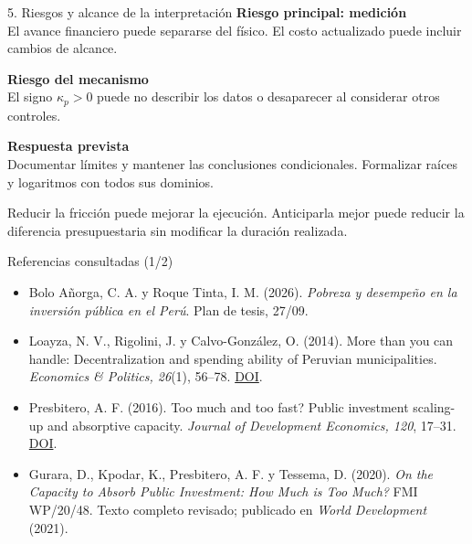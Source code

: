 \documentclass[11pt,aspectratio=169]{beamer}
\newcommand{\lead}[1]{\begin{block}{}#1\end{block}}
\begin{document}
\begin{frame}{5. Riesgos y alcance de la interpretación}
\textbf{Riesgo principal: medición}\\[1mm]
El avance financiero puede separarse del físico. El costo actualizado puede incluir cambios de alcance.
\par\vspace{4mm}
\textbf{Riesgo del mecanismo}\\[1mm]
El signo $\kappa_p>0$ puede no describir los datos o desaparecer al considerar otros controles.
\par\vspace{4mm}
\textbf{Respuesta prevista}\\[1mm]
Documentar límites y mantener las conclusiones condicionales. Formalizar raíces y logaritmos con todos sus dominios.
\lead{Reducir la fricción puede mejorar la ejecución. Anticiparla mejor puede reducir la diferencia presupuestaria sin modificar la duración realizada.}
\end{frame}

\appendix
\begin{frame}{Referencias consultadas (1/2)}
\small
\begin{itemize}\setlength{\itemsep}{3mm}
\item Bolo Añorga, C. A. y Roque Tinta, I. M. (2026). \emph{Pobreza y desempeño en la inversión pública en el Perú}. Plan de tesis, 27/09.
\item Loayza, N. V., Rigolini, J. y Calvo-González, O. (2014). More than you can handle: Decentralization and spending ability of Peruvian municipalities. \emph{Economics \& Politics, 26}(1), 56--78. \href{https://doi.org/10.1111/ecpo.12026}{DOI}.
\item Presbitero, A. F. (2016). Too much and too fast? Public investment scaling-up and absorptive capacity. \emph{Journal of Development Economics, 120}, 17--31. \href{https://doi.org/10.1016/j.jdeveco.2015.12.005}{DOI}.
\item Gurara, D., Kpodar, K., Presbitero, A. F. y Tessema, D. (2020). \emph{On the Capacity to Absorb Public Investment: How Much is Too Much?} FMI WP/20/48. Texto completo revisado; publicado en \emph{World Development} (2021).
\end{itemize}
\end{frame}
\end{document}
